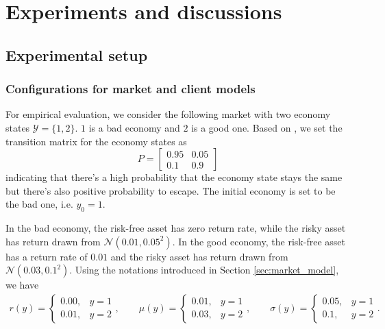 \chapter{Experiments and discussions}\label{sec:exp}
\section{Experimental setup}\label{sec:setup}

\subsection{Configurations for market and client models}
For empirical evaluation, we consider the following market with two economy states $\mathcal Y=\{1,2\}$. $1$ is a bad economy and $2$ is a good one. Based on , we set the transition matrix for the economy states as $$P=\begin{bmatrix}
0.95 & 0.05\\
0.1 & 0.9
\end{bmatrix}$$ indicating that there's a high probability that the economy state stays the same but there's also positive probability to escape. The initial economy is set to be the bad one, i.e. $y_0=1$.

In the bad economy, the risk-free asset has zero return rate, while the risky asset has return drawn from $\mathcal N(0.01,0.05^2)$. In the good economy, the risk-free asset has a return rate of $0.01$ and the risky asset has return drawn from $\mathcal N(0.03, 0.1^2)$. Using the notations introduced in Section \ref{sec:market_model}, we have
    \begin{align*}
    r(y)=\begin{cases}0.00,&y=1\\
    0.01, & y=2
    \end{cases},\qquad
    \mu(y)=\begin{cases}0.01,&y=1\\
    0.03, & y=2
    \end{cases},\qquad
    \sigma(y)=\begin{cases}0.05,&y=1\\
    0.1, & y=2
    \end{cases}.\qquad
    \end{align*}


